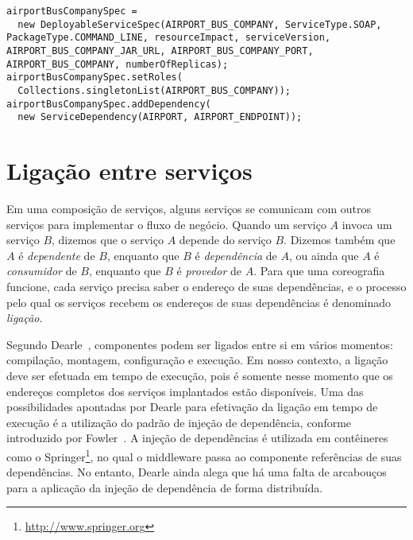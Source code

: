 \lstset{
language=Java,
}

{\scriptsize
\begin{lstlisting}[breaklines, caption={Trecho da especificação de uma coreografia.}, label={lst:service_spec}]
airportBusCompanySpec =
  new DeployableServiceSpec(AIRPORT_BUS_COMPANY, ServiceType.SOAP, PackageType.COMMAND_LINE, resourceImpact, serviceVersion, AIRPORT_BUS_COMPANY_JAR_URL, AIRPORT_BUS_COMPANY_PORT, AIRPORT_BUS_COMPANY, numberOfReplicas);
airportBusCompanySpec.setRoles(
  Collections.singletonList(AIRPORT_BUS_COMPANY));
airportBusCompanySpec.addDependency(
  new ServiceDependency(AIRPORT, AIRPORT_ENDPOINT));
\end{lstlisting}
}

\section{Ligação entre serviços}
\label{sec:ligacao}

Em uma composição de serviços, alguns serviços se comunicam com outros serviços para implementar o fluxo de negócio.
Quando um serviço $A$ invoca um serviço $B$, dizemos que o serviço $A$ depende do serviço $B$. 
Dizemos também que $A$ é \emph{dependente} de $B$, enquanto que $B$ é \emph{dependência} de $A$,
ou ainda que $A$ é \emph{consumidor} de $B$, enquanto que $B$ é \emph{provedor} de $A$.
Para que uma coreografia funcione, cada serviço precisa saber o endereço de suas dependências,
e o processo pelo qual os serviços recebem os endereços de suas dependências é denominado \emph{ligação}.

Segundo Dearle~\cite{Dearle2007PastPresentFuture}, componentes podem ser ligados entre si em vários momentos: compilação, montagem, configuração e execução. Em nosso contexto, a ligação deve ser efetuada em tempo de execução, pois é somente nesse momento que os endereços completos dos serviços implantados estão disponíveis. Uma das possibilidades apontadas por Dearle para efetivação da ligação em tempo de execução é a utilização do padrão de injeção de dependência, conforme introduzido por Fowler~\cite{Fowler2004Inversion}. A injeção de dependências é utilizada em contêineres como o Springer\footnote{\url{http://www.springer.org}}, no qual o middleware passa ao componente referências de suas dependências. No entanto, Dearle ainda alega que há uma falta de arcabouços para a aplicação da injeção de dependência de forma distribuída.

